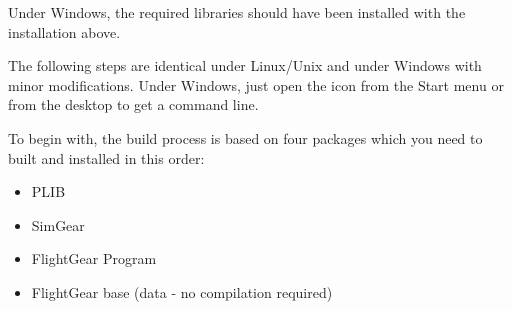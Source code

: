 Under Windows, the required libraries should have been installed with the \Cygwin{} installation above.

The following steps are identical under Linux/Unix and under Windows with minor
modifications. Under Windows, just open the \Cygwin{} icon from the Start menu or from
the desktop to get a command line.

To begin with, the \FlightGear{} build process is based on four packages which you need to built and installed in this order:

\begin{itemize}
\item PLIB
\item SimGear
\item FlightGear Program
\item FlightGear base (data - no compilation required)
\end{itemize}

